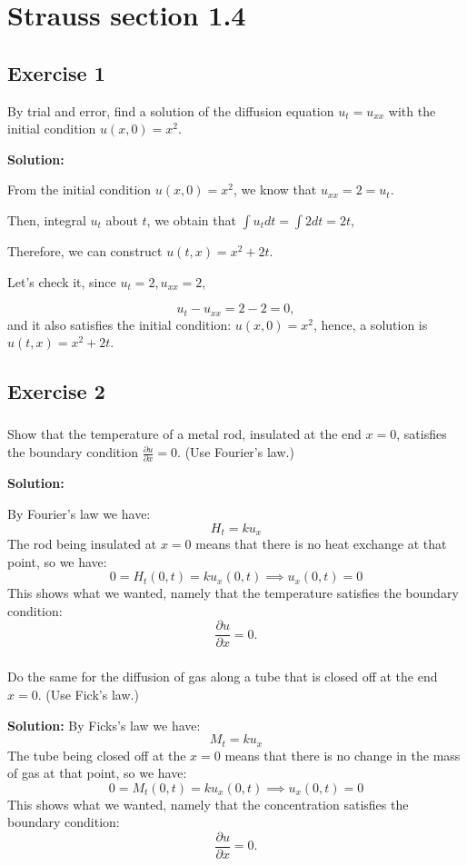 \documentclass{article}
\begin{document}
\section{Strauss section 1.4}
\subsection{Exercise 1}
By trial and error, find a solution of the diffusion equation $u_t=u_{xx}$ with the initial condition $u(x,0)=x^2.$
		
\textbf{Solution:}

From the initial condition $u(x,0)=x^2$, we know that $u_{xx}=2=u_t$.
		
		Then, integral $u_{t}$ about $t$, we obtain that $\int u_{t} dt= \int 2 dt = 2t$,

		Therefore, we can construct $u(t,x)=x^2+2t$.

		Let's check it, since $u_{t}=2, u_{xx}=2$,

		\[u_{t}-u_{xx}=2-2=0,\] and it also satisfies the initial condition: $u(x,0)=x^2$, hence, a solution is $u(t,x)=x^2+2t$.

		\subsection{Exercise 2}
		\subsubsection{}
		Show that the temperature of a metal rod,
			insulated at the end $x=0$, satisfies the boundary
			condition $\frac{\partial u}{\partial x} =0$. (Use
		Fourier's law.)

		\textbf{Solution:}

			By Fourier's law we have:
			\[
				H_t = ku_x
			\]
			The rod being insulated at $x=0$ means that there is no
			heat exchange at that point, so we have:
			\[
				0 = H_t(0,t) = ku_x(0,t) \implies u_x(0,t) =0
			\]
			This shows what we wanted, namely that the temperature
			satisfies the boundary condition:
			\[
				\frac{\partial u}{\partial x} =0.
			\]
		\subsubsection{}
		Do the same for the diffusion of gas along a tube that is closed off at the end $x=0$. (Use Fick's law.)
		
		\textbf{Solution:}
			By Ficks's law we have:
			\[
				M_t = ku_x
			\]
			The tube being closed off at the $x=0$ means that there is no
			change in the mass of gas at that point, so we have:
			\[
				0 = M_t(0,t) = ku_x(0,t) \implies u_x(0,t) =0
			\]
			This shows what we wanted, namely that the concentration
			satisfies the boundary condition:
			\[
				\frac{\partial u}{\partial x} =0.
			\]
\end{document}
